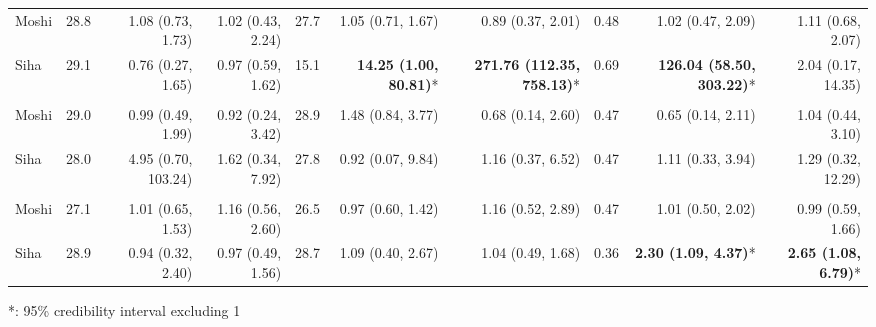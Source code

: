 \begin{table}[t]
\begin{tabular*}{\linewidth}{@{\extracolsep{\fill}}l|rrrrrrrrr}
\midrule\addlinespace[2.5pt]
\multicolumn{10}{l}{Typhoid} \\[2.5pt] 
\midrule\addlinespace[2.5pt]
Moshi & 28.8 & 1.08 (0.73, 1.73) & 1.02 (0.43, 2.24) & 27.7 & 1.05 (0.71, 1.67) & 0.89 (0.37, 2.01) & 0.48 & 1.02 (0.47, 2.09) & 1.11 (0.68, 2.07) \\ 
Siha & 29.1 & 0.76 (0.27, 1.65) & 0.97 (0.59, 1.62) & 15.1 & \textbf{14.25 (1.00, 80.81)}* & \textbf{271.76 (112.35, 758.13)}* & 0.69 & \textbf{126.04 (58.50, 303.22)}* & 2.04 (0.17, 14.35) \\ 
\midrule\addlinespace[2.5pt]
\multicolumn{10}{l}{Leprosy} \\[2.5pt] 
\midrule\addlinespace[2.5pt]
Moshi & 29.0 & 0.99 (0.49, 1.99) & 0.92 (0.24, 3.42) & 28.9 & 1.48 (0.84, 3.77) & 0.68 (0.14, 2.60) & 0.47 & 0.65 (0.14, 2.11) & 1.04 (0.44, 3.10) \\ 
Siha & 28.0 & 4.95 (0.70, 103.24) & 1.62 (0.34, 7.92) & 27.8 & 0.92 (0.07, 9.84) & 1.16 (0.37, 6.52) & 0.47 & 1.11 (0.33, 3.94) & 1.29 (0.32, 12.29) \\ 
\midrule\addlinespace[2.5pt]
\multicolumn{10}{l}{Schistosomiasis} \\[2.5pt] 
\midrule\addlinespace[2.5pt]
Moshi & 27.1 & 1.01 (0.65, 1.53) & 1.16 (0.56, 2.60) & 26.5 & 0.97 (0.60, 1.42) & 1.16 (0.52, 2.89) & 0.47 & 1.01 (0.50, 2.02) & 0.99 (0.59, 1.66) \\ 
Siha & 28.9 & 0.94 (0.32, 2.40) & 0.97 (0.49, 1.56) & 28.7 & 1.09 (0.40, 2.67) & 1.04 (0.49, 1.68) & 0.36 & \textbf{2.30 (1.09, 4.37)}* & \textbf{2.65 (1.08, 6.79)}* \\ 
\bottomrule
\end{tabular*}
\begin{minipage}{\linewidth}
*: 95\% credibility interval excluding 1\\
\end{minipage}
\end{table}

